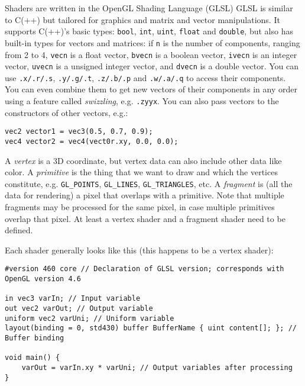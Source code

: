 \documentclass[8pt, table, xcdraw]{article}%
\begin{document}
Shaders are written in the OpenGL Shading Language (GLSL) GLSL is similar to C(++) but tailored for graphics and matrix and vector manipulations. It supports C(++)'s basic types: \lstinline{bool}, \lstinline{int}, \lstinline{uint}, \lstinline{float} and \lstinline{double}, but also has built-in types for vectors and matrices: if \lstinline{n} is the number of components, ranging from 2 to 4, \lstinline{vecn} is a float vector, \lstinline{bvecn} is a boolean vector, \lstinline{ivecn} is an integer vector, \lstinline{uvecn} is a unsigned integer vector, and \lstinline{dvecn} is a double vector. You can use \lstinline{.x/.r/.s}, \lstinline{.y/.g/.t}, \lstinline{.z/.b/.p} and \lstinline{.w/.a/.q} to access their components. You can even combine them to get new vectors of their components in any order using a feature called \emph{swizzling}, e.g. \lstinline{.zyyx}. You can also pass vectors to the constructors of other vectors, e.g.:

\begin{lstlisting}
vec2 vector1 = vec3(0.5, 0.7, 0.9);
vec4 vector2 = vec4(vect0r.xy, 0.0, 0.0);
\end{lstlisting}

A \emph{vertex} is a 3D coordinate, but vertex data can also include other data like color. A \emph{primitive} is the thing that we want to draw and which the vertices constitute, e.g. \lstinline{GL_POINTS}, \lstinline{GL_LINES}, \lstinline{GL_TRIANGLES}, etc. A \emph{fragment} is (all the data for rendering) a pixel that overlaps with a primitive. Note that multiple fragments may be processed for the same pixel, in case multiple primitives overlap that pixel. At least a vertex shader and a fragment shader need to be defined.

Each shader generally looks like this (this happens to be a vertex shader):

\begin{lstlisting}
#version 460 core // Declaration of GLSL version; corresponds with OpenGL version 4.6

in vec3 varIn; // Input variable
out vec2 varOut; // Output variable
uniform vec2 varUni; // Uniform variable
layout(binding = 0, std430) buffer BufferName { uint content[]; }; // Buffer binding

void main() {
    varOut = varIn.xy * varUni; // Output variables after processing
}
\end{lstlisting}
\end{document}
